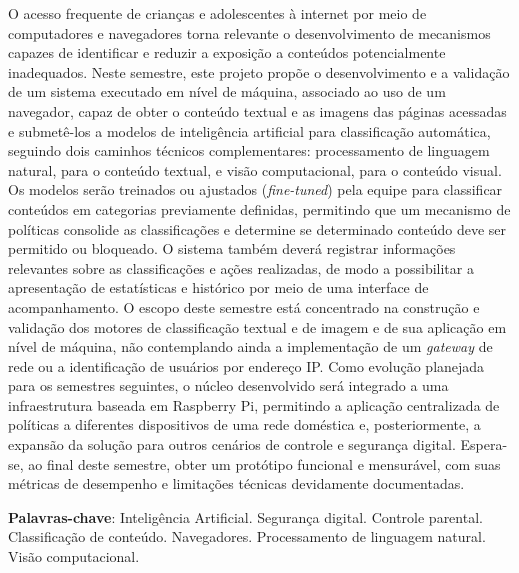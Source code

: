 \documentclass[
    12pt,           %
    oneside,        %
    a4paper,        %
    chapter=TITLE,  %
    english,        %
    brazil          %
]{abntex2}
\begin{document}
\begin{resumo}
    \SingleSpacing

    O acesso frequente de crianças e adolescentes à internet por meio de
    computadores e navegadores torna relevante o desenvolvimento de mecanismos
    capazes de identificar e reduzir a exposição a conteúdos potencialmente
    inadequados. Neste semestre, este projeto propõe o desenvolvimento e a
    validação de um sistema executado em nível de máquina, associado ao uso de
    um navegador, capaz de obter o conteúdo textual e as imagens das páginas
    acessadas e submetê-los a modelos de inteligência artificial para
    classificação automática, seguindo dois caminhos técnicos complementares:
    processamento de linguagem natural, para o conteúdo textual, e visão
    computacional, para o conteúdo visual. Os modelos serão treinados ou
    ajustados (\textit{fine-tuned}) pela equipe para classificar conteúdos em
    categorias previamente definidas, permitindo que um mecanismo de políticas
    consolide as classificações e determine se determinado conteúdo deve ser
    permitido ou bloqueado. O sistema também deverá registrar informações
    relevantes sobre as classificações e ações realizadas, de modo a
    possibilitar a apresentação de estatísticas e histórico por meio de uma
    interface de acompanhamento. O escopo deste semestre está concentrado na
    construção e validação dos motores de classificação textual e de imagem e
    de sua aplicação em nível de máquina, não contemplando ainda a
    implementação de um \textit{gateway} de rede ou a identificação de
    usuários por endereço IP.
    Como evolução planejada para os semestres seguintes, o núcleo desenvolvido
    será integrado a uma infraestrutura baseada em Raspberry Pi, permitindo a
    aplicação centralizada de políticas a diferentes dispositivos de uma rede
    doméstica e, posteriormente, a expansão da solução para outros cenários de
    controle e segurança digital. Espera-se, ao final deste semestre, obter um
    protótipo funcional e mensurável, com suas métricas de desempenho e
    limitações técnicas devidamente documentadas.

    \vspace{\onelineskip}
    \noindent

    \textbf{Palavras-chave}: Inteligência Artificial. Segurança digital. Controle parental. Classificação de conteúdo. Navegadores. Processamento de linguagem natural. Visão computacional.
\end{resumo}
\end{document}
